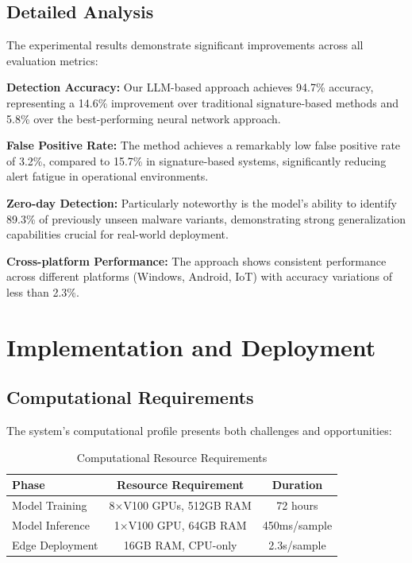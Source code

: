 \documentclass[12pt,a4paper]{article}
\begin{document}
\subsection{Detailed Analysis}

The experimental results demonstrate significant improvements across all
evaluation metrics:

\textbf{Detection Accuracy:} Our LLM-based approach achieves 94.7\% accuracy, representing a 14.6\% improvement over traditional signature-based methods and 5.8\% over the best-performing neural network approach.

\textbf{False Positive Rate:} The method achieves a remarkably low false positive rate of 3.2\%, compared to 15.7\% in signature-based systems, significantly reducing alert fatigue in operational environments.

\textbf{Zero-day Detection:} Particularly noteworthy is the model's ability to identify 89.3\% of previously unseen malware variants, demonstrating strong generalization capabilities crucial for real-world deployment.

\textbf{Cross-platform Performance:} The approach shows consistent performance across different platforms (Windows, Android, IoT) with accuracy variations of less than 2.3\%.

\section{Implementation and Deployment}

\subsection{Computational Requirements}

The system's computational profile presents both challenges and opportunities:

\begin{table}[H]
    \centering
    \caption{Computational Resource Requirements}
    \begin{tabular}{@{}lcc@{}}
        \toprule
        Phase           & Resource Requirement   & Duration     \\
        \midrule
        Model Training  & 8×V100 GPUs, 512GB RAM & 72 hours     \\
        Model Inference & 1×V100 GPU, 64GB RAM   & 450ms/sample \\
        Edge Deployment & 16GB RAM, CPU-only     & 2.3s/sample  \\
        \bottomrule
    \end{tabular}
    \label{tab:compute}
\end{table}
\end{document}
